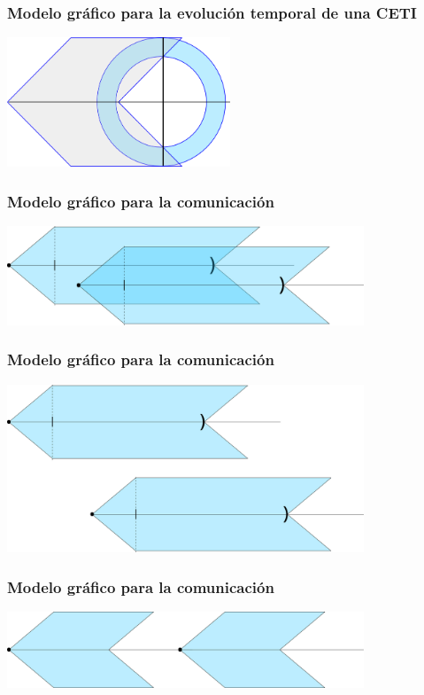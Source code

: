 \documentclass[handout]{beamer}
\theoremstyle{plain}
\theoremstyle{definition}
\theoremstyle{remark}
\begin{document}
\begin{frame}\frametitle{Modelo gráfico para la evolución temporal de
   una CETI}
\centering
\includegraphics[width=0.5\textwidth]{g5120.png}
\end{frame}

\begin{frame}\frametitle{Modelo gráfico para la comunicación}
\centering
\includegraphics[width=0.8\textwidth]{g5331.png}
\end{frame}

\begin{frame}\frametitle{Modelo gráfico para la comunicación}
\centering
\includegraphics[width=0.8\textwidth]{g5459.png}
\end{frame}

\begin{frame}\frametitle{Modelo gráfico para la comunicación}
\centering
\includegraphics[width=0.8\textwidth]{g5539.png}
\end{frame}
\end{document}
